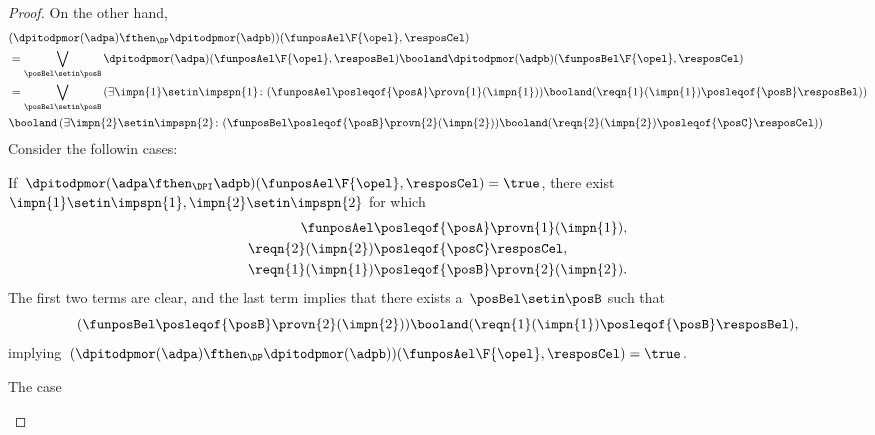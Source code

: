 \begin{proof}
    On the other hand,
    \begin{equation}
        \label{eq:dpitodp_b}
        \begin{aligned}
             & (\dpitodpmor(\adpa) \fthen_\DP \dpitodpmor(\adpb))(\funposAel\F{\opel},\resposCel) \\
             & =\bigvee_{\posBel \setin \posB}\dpitodpmor(\adpa)(\funposAel\F{\opel},\resposBel)\booland \dpitodpmor(\adpb)(\funposBel\F{\opel},\resposCel) \\
             & =\bigvee_{\posBel \setin \posB} \left({\exists \impn{1} \setin \impspn{1}\colon (\funposAel \posleqof{\posA}\provn{1}(\impn{1}))\booland (\reqn{1}(\impn{1})\posleqof{\posB} \resposBel)}\right) \\
             & \booland \left({\exists \impn{2} \setin \impspn{2}\colon (\funposBel \posleqof{\posB}\provn{2}(\impn{2}))\booland (\reqn{2}(\impn{2})\posleqof{\posC} \resposCel)}\right)
        \end{aligned}
    \end{equation}
    Consider the followin cases:
    \begin{compactitem}
        \item If~$\dpitodpmor(\adpa \fthen_\DPI \adpb)(\funposAel\F{\opel},\resposCel)=\true$, there exist~$\impn{1}\setin \impspn{1},\impn{2}\setin \impspn{2}$ for which
              \begin{equation*}
                  \begin{aligned}
                      \funposAel         & \posleqof{\posA}\provn{1}(\impn{1}), \\
                      \reqn{2}(\impn{2}) & \posleqof{\posC} \resposCel, \\
                      \reqn{1}(\impn{1}) & \posleqof{\posB}\provn{2}(\impn{2}).
                  \end{aligned}
              \end{equation*}
              The first two terms are clear, and the last term implies that there exists a~$\posBel\setin \posB$ such that
              \begin{equation*}
                  (\funposBel\posleqof{\posB}\provn{2}(\impn{2}))\booland (\reqn{1}(\impn{1})\posleqof{\posB}\resposBel),
              \end{equation*}
              implying~$(\dpitodpmor(\adpa) \fthen_\DP \dpitodpmor(\adpb))(\funposAel\F{\opel},\resposCel)=\true$.
        \item The case
              \begin{equation*}

\end{equation*}
\end{compactitem}
\end{proof}
